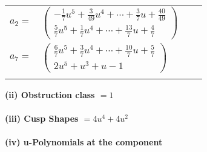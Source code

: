 \documentclass[1p]{elsarticle_modified}
\theoremstyle{definition}
\begin{document}
\begin{tabular}{m{7pt} m{180pt} m{7pt} m{180pt} }
\flushright $a_{2}=$&$\begin{pmatrix}-\frac{1}{7} u^5+\frac{3}{49} u^4+\cdots+\frac{3}{7} u+\frac{40}{49}\\\frac{5}{7} u^5+\frac{1}{7} u^4+\cdots+\frac{13}{7} u+\frac{4}{7}\end{pmatrix}$ \\
\flushright $a_{7}=$&$\begin{pmatrix}\frac{6}{7} u^5+\frac{3}{7} u^4+\cdots+\frac{10}{7} u+\frac{5}{7}\\2 u^5+u^3+u-1\end{pmatrix}$\\&\end{tabular}
\flushleft \textbf{(ii) Obstruction class $= 1$}\\~\\
\flushleft \textbf{(iii) Cusp Shapes $= 4 u^4+4 u^2$}\\~\\
\newpage\renewcommand{\arraystretch}{1}
\flushleft \textbf{(iv) u-Polynomials at the component}\newline \\
\end{document}

